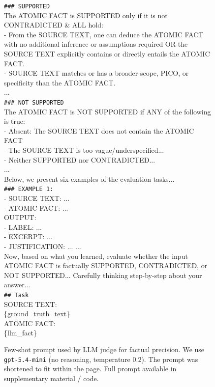 \documentclass{article}
\begin{document}
\begin{figure}[t]
\begin{small}
\begin{tcolorbox}[
    colback=gray!5,
    colframe=black,
    width=\linewidth,
    arc=2mm,
    boxrule=0.5pt,
    title=\textbf{LLM Judge Prompt for Factual Precision Evaluation}
]
\texttt{\#\#\# SUPPORTED} \\
The ATOMIC FACT is SUPPORTED only if it is not CONTRADICTED \& ALL hold:\\
- From the SOURCE TEXT, one can deduce the ATOMIC FACT with no additional inference or assumptions required OR the SOURCE TEXT explicitly contains or directly entails the ATOMIC FACT.\\
- SOURCE TEXT matches or has a broader scope, PICO, or specificity than the ATOMIC FACT. \\
...\\

\texttt{\#\#\# NOT SUPPORTED} \\
The ATOMIC FACT is NOT SUPPORTED if ANY of the following is true:\\
- Absent: The SOURCE TEXT does not contain the ATOMIC FACT\\
- The SOURCE TEXT is too vague/underspecified...\\
- Neither SUPPORTED nor CONTRADICTED...\\
...\\

Below, we present six examples of the evaluation tasks...\\
\texttt{\#\#\# EXAMPLE 1:}\\
- SOURCE TEXT: ...\\
- ATOMIC FACT: ...\\
OUTPUT: \\
- LABEL: ...\\
- EXCERPT: ... \\
- JUSTIFICATION: ... 
...\\

Now, based on what you learned, evaluate whether the input ATOMIC FACT is factually SUPPORTED, CONTRADICTED, or NOT SUPPORTED... Carefully thinking step-by-step about your answer...\\ 

\texttt{\#\# Task}\\
SOURCE TEXT: \\
\{ground\_truth\_text\}\\

ATOMIC FACT: \\
\{llm\_fact\}
\end{tcolorbox}

\caption{Few-shot prompt used by LLM judge for factual precision. We use \texttt{gpt-5.4-mini} (no reasoning, temperature 0.2). The prompt was shortened to fit within the page. Full prompt available in supplementary material / code.}
\label{fig:fact-precision-prompt}
\end{small}
\end{figure}
\end{document}
